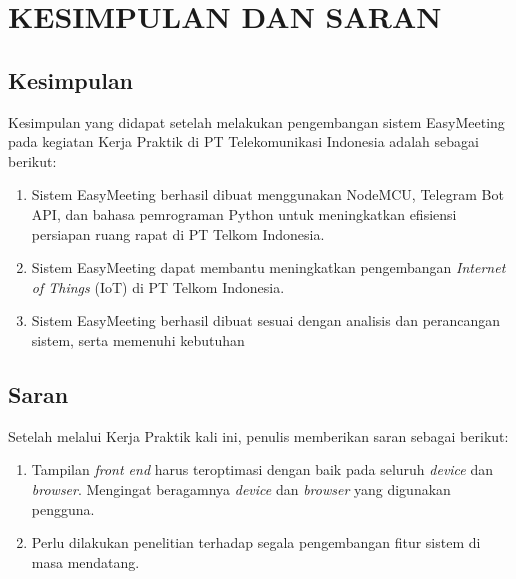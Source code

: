 \chapter{KESIMPULAN DAN SARAN}

\section{Kesimpulan}
\tab Kesimpulan yang didapat setelah melakukan pengembangan sistem EasyMeeting pada kegiatan Kerja Praktik di PT Telekomunikasi Indonesia adalah sebagai berikut:
\begin{enumerate}
\item Sistem EasyMeeting berhasil dibuat menggunakan NodeMCU, Telegram Bot API, dan bahasa pemrograman Python untuk meningkatkan efisiensi persiapan ruang rapat di PT Telkom Indonesia.
\item Sistem EasyMeeting dapat membantu meningkatkan pengembangan \textit{Internet of Things} (IoT) di PT Telkom Indonesia.
\item Sistem EasyMeeting berhasil dibuat sesuai dengan analisis dan perancangan sistem, serta memenuhi kebutuhan
\end{enumerate}

\section{Saran}
Setelah melalui Kerja Praktik kali ini, penulis memberikan saran sebagai berikut:
\begin{enumerate}
\item Tampilan \textit{front end} harus teroptimasi dengan baik pada seluruh \textit{device} dan \textit{browser}. Mengingat beragamnya \textit{device} dan \textit{browser} yang digunakan pengguna.
\item Perlu dilakukan penelitian terhadap segala pengembangan fitur sistem di masa mendatang.
\end{enumerate}